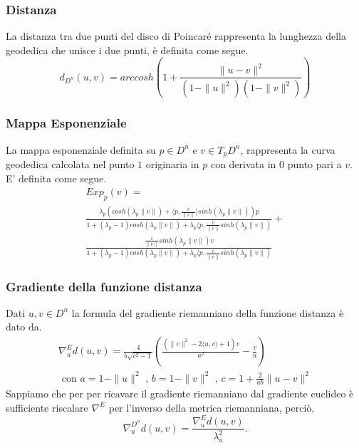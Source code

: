 \documentclass[a4paper, 12pt]{article}
\begin{document}
\subsubsection{Distanza}
La distanza tra due punti del disco di Poincaré rappresenta la lunghezza della geodedica che unisce i due punti, è definita come segue.\\
\[d_{D^n}(u, v) = arccosh(1 + \frac{\parallel u - v\parallel^2}{(1-\parallel u \parallel^2)(1-\parallel v \parallel^2)})\]
\subsubsection{Mappa Esponenziale}
La mappa esponenziale definita su $p \in D^n$ e $v \in T_pD^n$, rappresenta la curva geodedica calcolata nel punto $1$ originaria in $p$ con derivata in $0$ punto pari a $v$. E' definita come segue.\\
\begin{equation*}\begin{gathered}
Exp_p(v) = \\ \frac{\lambda_p (cosh(\lambda_p \parallel v \parallel) + \langle p,\frac{v}{\parallel v \parallel} \rangle sinh(\lambda_p \parallel v \parallel))p}{1 + (\lambda_p - 1) cosh(\lambda_p \parallel v \parallel) + \lambda_p \langle p, \frac{v}{\parallel v \parallel} sinh(\lambda_p \parallel v \parallel)} + \\ \frac{\frac{1}{\parallel v \parallel} sinh(\lambda_p \parallel v \parallel) v}{1 + (\lambda_p - 1) cosh(\lambda_p \parallel v \parallel) + \lambda_p \langle p, \frac{v}{\parallel v \parallel} sinh(\lambda_p \parallel v \parallel)}
\end{gathered}\end{equation*}
\subsubsection{Gradiente della funzione distanza}
Dati $u,v \in D^n$ la formula del gradiente riemanniano della funzione distanza è dato da.\\
\begin{equation*}\begin{gathered}
\nabla_u^{E} d(u,v) = \frac{4}{b \sqrt{c^2 - 1}} (\frac{(\parallel v \parallel^2 - 2\langle u,v \rangle + 1)v}{a^2} - \frac{v}{a}) \\ \mbox{ con } a = 1 - \parallel u \parallel^2 \mbox{ , } b = 1 - \parallel v \parallel^2 \mbox{ , } c = 1 + \frac{2}{ab} \parallel u - v \parallel^2
\end{gathered}\end{equation*}
Sappiamo che per per ricavare il gradiente riemanniano dal gradiente euclideo è sufficiente riscalare $\nabla^E$ per l'inverso della metrica riemanniana, perciò,\\ \[\nabla_u^{D^n} d(u,v) = \frac{\nabla_u^{E} d(u,v)}{\lambda_u^2}.\]
\end{document}
